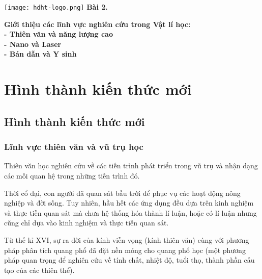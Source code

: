 \newcommand{\chapter}[2][]{
	\newcommand{\chapname}{#2}
	\begin{flushleft}
		\begin{minipage}[t]{\linewidth}
			\texttt{[image: hdht-logo.png]}
			\hspace{0pt}	
			\sffamily\bfseries\large Bài 2.
			\begin{flushleft}
				\Large\bfseries #1
			\end{flushleft}
		\end{minipage}
	\end{flushleft}
	\vspace{1cm}
	\normalfont\normalsize
}
\chapter[Giới thiệu các lĩnh vực nghiên cứu trong Vật lí học:\\ - Thiên văn và năng lượng cao \\-  Nano và Laser \\- Bán dẫn và Y sinh]{Giới thiệu các lĩnh vực nghiên cứu trong Vật lí học:\\ Thiên văn và năng lượng cao - Nano và Laser \\- Bán dẫn và Y sinh}
\section{Hình thành kiến thức mới}

\subsection{Hình thành kiến thức mới}
\subsubsection{Lĩnh vực thiên văn và vũ trụ học}
Thiên văn học nghiên cứu về các tiến trình phát triển trong vũ trụ và nhận dạng các mối quan hệ trong những tiến trình đó.

Thời cổ đại, con người đã quan sát bầu trời để phục vụ các hoạt động nông nghiệp và đời sống. Tuy nhiên, hầu hết các ứng dụng đều dựa trên kinh nghiệm và thực tiễn quan sát mà chưa hệ thống hóa thành lí luận, hoặc có lí luận nhưng cũng chỉ dựa vào kinh nghiệm và thực tiễn quan sát.

Từ thế kỉ XVI, sự ra đời của kính viễn vọng (kính thiên văn) cùng với phương pháp phân tích quang phổ đã đặt nền móng cho quang phổ học (một phương pháp quan trọng để nghiên cứu về tính chất, nhiệt độ, tuổi thọ, thành phần cấu tạo của các thiên thể).

